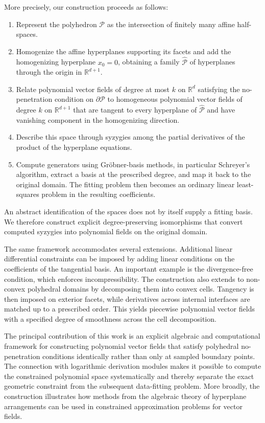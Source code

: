\documentclass[a4paper]{article}
\theoremstyle{plain}
\theoremstyle{definition}
\theoremstyle{remark}
\numberwithin{theorem}{section}
\newcommand{\mP}{\mathcal{P}}
\newcommand{\R}{\mathbb{R}}
\newcommand{\hmp}{\widehat{\mathcal{P}}}
\begin{document}
More precisely, our construction proceeds as follows:
\begin{enumerate}
\item Represent the polyhedron $\mP$ as the intersection of finitely many affine half-spaces.
\item Homogenize the affine hyperplanes supporting its facets and add the homogenizing hyperplane $x_0=0$, obtaining a family $\hmp$ of hyperplanes through the origin in $\R^{d+1}$.
\item Relate polynomial vector fields of degree at most $k$ on $\R^d$ satisfying the no-penetration condition on $\partial\mP$ to homogeneous polynomial vector fields of degree $k$ on $\R^{d+1}$ that are tangent to every hyperplane of $\hmp$ and have vanishing component in the homogenizing direction.
\item Describe this space through syzygies among the partial derivatives of the product of the hyperplane equations.
\item Compute generators using Gr\"obner-basis methods, in particular Schreyer's algorithm, extract a basis at the prescribed degree, and map it back to the original domain.
The fitting problem then becomes an ordinary linear least-squares problem in the resulting coefficients.
\end{enumerate}

An abstract identification of the spaces does not by itself supply a fitting basis. We therefore construct explicit degree-preserving isomorphisms that convert computed syzygies into polynomial fields on the original domain.

The same framework accommodates several extensions.
Additional linear differential constraints can be imposed by adding linear conditions on the coefficients of the tangential basis.
An important example is the divergence-free condition, which enforces incompressibility.
The construction also extends to non-convex polyhedral domains by decomposing them into convex cells.
Tangency is then imposed on exterior facets, while derivatives across internal interfaces are matched up to a prescribed order.
This yields piecewise polynomial vector fields with a specified degree of smoothness across the cell decomposition.

The principal contribution of this work is an explicit algebraic and computational framework for constructing polynomial vector fields that satisfy polyhedral no-penetration conditions identically rather than only at sampled boundary points.
The connection with logarithmic derivation modules makes it possible to compute the constrained polynomial space systematically and thereby separate the exact geometric constraint from the subsequent data-fitting problem.
More broadly, the construction illustrates how methods from the algebraic theory of hyperplane arrangements can be used in constrained approximation problems for vector fields.
\end{document}
